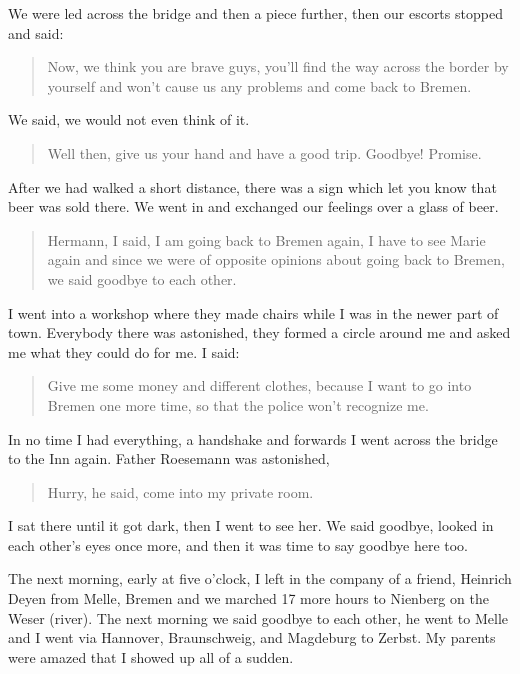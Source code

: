 \documentclass{article}
\begin{document}
We were led across the bridge and then a piece further, then our escorts stopped and said:

\begin{quote}
Now, we think you are brave guys, you'll find the way across the border by yourself and won't cause us any problems and come back to Bremen.
\end{quote}

We said, we would not even think of it.

\begin{quote}
Well then, give us your hand and have a good trip. Goodbye! Promise.
\end{quote}

After we had walked a short distance, there was a sign which let you know that beer was sold there. We went in and exchanged our feelings over a glass of beer.

\begin{quote}
Hermann, I said, I am going back to Bremen again, I have to see Marie again and since we were of opposite opinions about going back to Bremen, we said goodbye to each other.
\end{quote}

I went into a workshop where they made chairs while I was in the newer part of town. Everybody there was astonished, they formed a circle around me and asked me what they could do for me. I said:

\begin{quote}
Give me some money and different clothes, because I want to go into Bremen one more time, so that the police won't recognize me.
\end{quote}

In no time I had everything, a handshake and forwards I went across the bridge to the Inn again. Father Roesemann was astonished,

\begin{quote}
Hurry, he said, come into my private room.
\end{quote}

I sat there until it got dark, then I went to see her. We said goodbye, looked in each other's eyes once more, and then it was time to say goodbye here too.

The next morning, early at five o'clock, I left in the company of a friend, Heinrich Deyen from Melle, Bremen and we marched 17 more hours to Nienberg on the Weser (river). The next morning we said goodbye to each other, he went to Melle and I went via Hannover, Braunschweig, and Magdeburg to Zerbst. My parents were amazed that I showed up all of a sudden.
\end{document}
